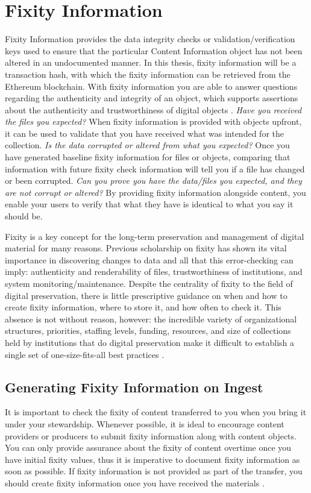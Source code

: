 \documentclass[final]{vutinfth}
\begin{document}
\section{Fixity Information}
Fixity Information provides the data integrity checks or validation/verification keys used to ensure that the particular Content Information object has not been altered in an undocumented manner\cite[8]{lee2010open}. In this thesis, fixity information will be a transaction hash, with which the fixity information can be retrieved from the Ethereum blockchain.
With fixity information you are able to answer questions regarding the authenticity and integrity of an object, which supports assertions about the authenticity and trustworthiness of digital objects \cite[3]{ndsa2017fixity}.
\newline \textit{Have you received the files you expected?} When fixity information is provided with objects upfront, it can be used to validate that you have received what was intended for the collection.
\newline \textit{Is the data corrupted or altered from what you expected?}  Once you have generated baseline fixity information for files or objects, comparing that information with future fixity check information will tell you if a file has changed or been corrupted.
\newline \textit{Can you prove you have the data/files you expected, and they are not corrupt or altered?} By providing fixity information alongside content, you enable your users to verify that what they have is identical to what you say it should be. 

Fixity is a key concept for the long-term preservation and management of digital material for many reasons. Previous scholarship on fixity has shown its vital importance in discovering changes to data and all that this error-checking can imply: authenticity and renderability of files, trustworthiness of institutions, and system monitoring/maintenance. Despite the centrality of fixity to the field of digital preservation, there is little prescriptive guidance on when and how to create fixity information, where to store it, and how often to check it. This absence is not without reason, however: the incredible variety of organizational structures, priorities, staffing levels, funding, resources, and size of collections held by institutions that do digital preservation make it difficult to establish a single set of one-size-fits-all best practices \cite[38]{ndsa2017fixity}.
\subsection{Generating Fixity Information on Ingest}
 It is important to check the fixity
of content transferred to you when you bring it under your stewardship. Whenever possible, it is ideal to encourage content providers or producers to submit fixity information along with content objects. You can only provide assurance about the fixity of content overtime once you have initial fixity values, thus it is imperative to document fixity information as soon as possible. If fixity information is not provided as part of the transfer, you should create fixity information once you have received the materials \cite[4]{ndsa2014fixity}.
\end{document}
